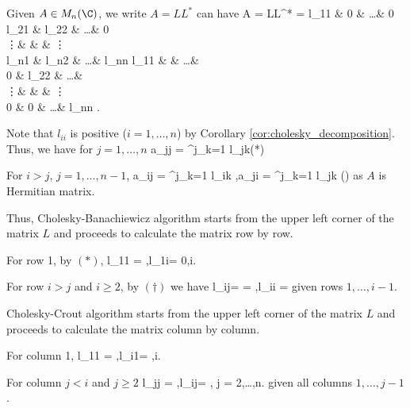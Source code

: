 \begin{algorithm}

Given $A\in M_n(\C)$, we write $A = LL^*$ can have%
\be
A = LL^* = \bepm
l_{11} & 0 & \dots & 0 \\
l_{21} & l_{22} & \dots & 0 \\
\vdots & & \ddots & \vdots \\
l_{n1} & l_{n2} & \dots & l_{nn}
\eepm\bepm
l_{11} &  & \dots &  \\
0 & l_{22} & \dots &  \\
\vdots & & \ddots & \vdots \\
0 & 0 & \dots & l_{nn}
\eepm.
\ee

Note that $l_{ii}$ is positive ($i=1,\dots,n$) by Corollary \ref{cor:cholesky_decomposition}. Thus, we have for $j = 1,\dots,n$
\be
a_{jj} = \sum^j_{k=1} l_{jk}\qquad (*)
\ee

For $i > j$, $j=1,\dots,n-1$,
\be
a_{ij} = \sum^{j}_{k=1} l_{ik} ,\qquad a_{ji} = \sum^{j}_{k=1} l_{jk} \qquad (\dag)
\ee
as $A$ is Hermitian matrix.

Thus, Cholesky-Banachiewicz algorithm starts from the upper left corner of the matrix $L$ and proceeds to calculate the matrix row by row.

For row 1, by $(*)$,
\be
l_{11} = ,\qquad l_{1i}= 0,\quad i.
\ee

For row $i>j$ and $i\geq 2$, by $(\dag)$ we have
\be
l_{ij}=  = ,\qquad l_{ii} = 
\ee
given rows $1,\dots,i-1$.

Cholesky-Crout algorithm starts from the upper left corner of the matrix $L$ and proceeds to calculate the matrix column by column.

For column 1,
\be
l_{11} = ,\qquad l_{i1}= ,\quad i.
\ee

For column $j<i$ and $j\geq 2$
\be
l_{jj} = ,\qquad l_{ij}= , \qquad j = 2,\dots,n.
\ee
given all columns $1,\dots,j-1$.
\end{algorithm}




